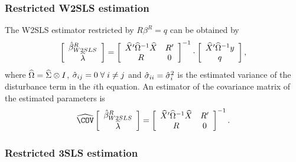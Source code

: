 \subsubsection{Restricted W2SLS estimation}

The W2SLS estimator restricted by $R \beta^R = q$ can be obtained by
\begin{equation}
   \left[ \begin{array}{c}
      \hat{\beta}^R_{W2SLS} \\ \widehat{\lambda}
   \end{array} \right]
   =
   \left[ \begin{array}{cc}
      \widehat{X}' \widehat{\Omega}^{-1} \widehat{X} & R' \\
      R & 0
   \end{array} \right]^{-1}
   \cdot
   \left[ \begin{array}{c}
      \widehat{X}' \widehat{\Omega}^{-1} y \\ q
   \end{array} \right] ,
\end{equation}
where $\widehat{\Omega} = \widehat{\Sigma} \otimes I$,
$\hat{\sigma}_{ij} = 0 \; \forall \; i \neq j$ and
$\hat{\sigma}_{ii} = \hat{\sigma}_i^2$ is the estimated variance
of the disturbance term in the $i$th equation.
An estimator of the covariance matrix of the estimated parameters is
\begin{equation}
   \COVHat
   \left[ \begin{array}{c}
      \bHat^R_{W2SLS} \\ \widehat{\lambda}
   \end{array} \right] 
   = 
   \left[ \begin{array}{cc}
      \widehat{X}' \OHat^{-1} \widehat{X} & R' \\
      R & 0
   \end{array} \right]^{-1} .
\end{equation}


\subsubsection{Restricted 3SLS estimation}

